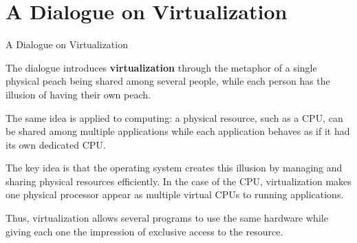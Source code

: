\section{A Dialogue on Virtualization}

\begin{frame}{A Dialogue on Virtualization}

{\small
The dialogue introduces \textbf{virtualization} through the metaphor of a
single physical peach being shared among several people, while each person
has the illusion of having their own peach.

\vspace{0.1cm}

The same idea is applied to computing: a physical resource, such as a CPU,
can be shared among multiple applications while each application behaves as
if it had its own dedicated CPU.

\vspace{0.1cm}

The key idea is that the operating system creates this illusion by managing
and sharing physical resources efficiently. In the case of the CPU,
virtualization makes one physical processor appear as multiple virtual CPUs
to running applications.

\vspace{0.1cm}

Thus, virtualization allows several programs to use the same hardware while
giving each one the impression of exclusive access to the resource.
}

\end{frame}